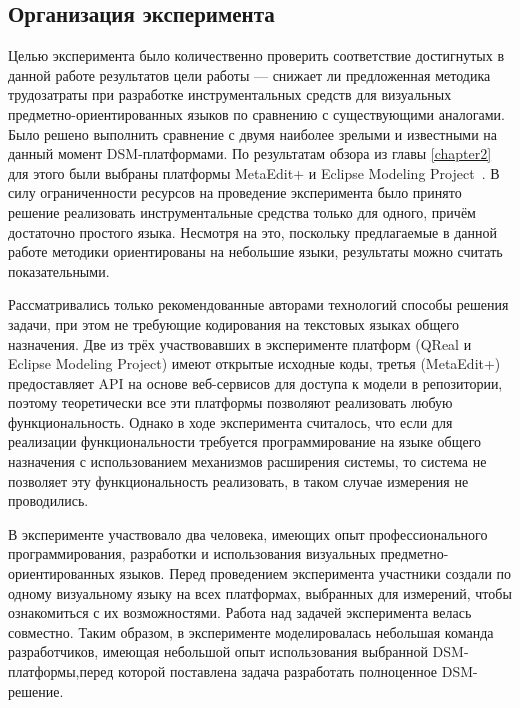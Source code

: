 \subsection{Организация эксперимента}
Целью эксперимента было количественно проверить соответствие достигнутых в данной работе результатов
цели работы --- снижает ли предложенная методика трудозатраты при разработке инструментальных
средств для визуальных предметно-ориентированных языков по сравнению с существующими аналогами.
Было решено выполнить сравнение с двумя наиболее зрелыми и известными на данный момент 
DSM-платформами. По результатам обзора из главы \ref{chapter2} для этого были выбраны платформы
MetaEdit+\cite{kelly2008domain} и Eclipse Modeling Project~\cite{emp}. В силу ограниченности
ресурсов на проведение эксперимента было принято решение реализовать инструментальные
средства только для одного, причём достаточно простого языка. Несмотря на это, поскольку 
предлагаемые в данной работе методики ориентированы на небольшие языки, результаты можно 
считать показательными. 

Рассматривались только рекомендованные авторами технологий способы решения задачи, 
при этом не требующие кодирования на текстовых языках общего назначения. Две из трёх
участвовавших в эксперименте платформ (QReal и Eclipse Modeling Project) имеют открытые 
исходные коды, третья (MetaEdit+) предоставляет \ac{API} на основе веб-сервисов для доступа
к модели в репозитории, поэтому теоретически все эти платформы позволяют реализовать любую
функциональность. Однако в ходе эксперимента считалось, что если для реализации функциональности
требуется программирование на языке общего назначения с использованием механизмов расширения системы, 
то система не позволяет эту функциональность реализовать, в таком случае измерения не проводились.

В эксперименте участвовало два человека, имеющих опыт профессионального программирования,
разработки и использования визуальных предметно-ориентированных языков. Перед проведением
эксперимента участники создали по одному визуальному языку на всех платформах, выбранных
для измерений, чтобы ознакомиться с их возможностями. Работа над задачей эксперимента
велась совместно. Таким образом, в эксперименте моделировалась небольшая команда разработчиков, 
имеющая небольшой опыт использования выбранной \ac{DSM}-платформы,перед которой поставлена 
задача разработать полноценное \ac{DSM}-решение.

